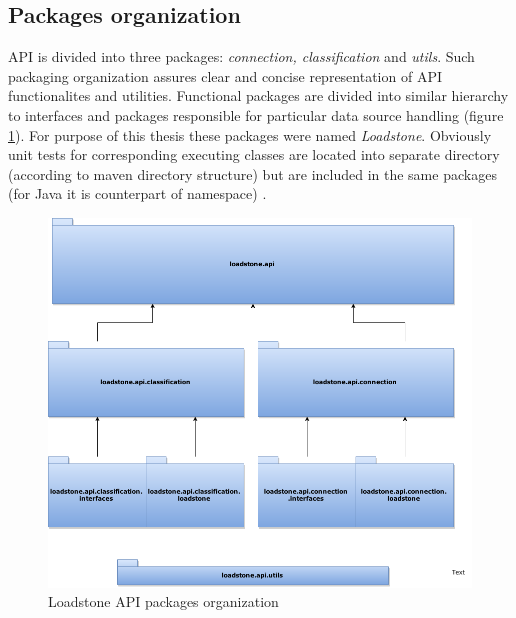 \subsection{Packages organization}
API is divided into three packages: \textit{connection, classification} and \textit{utils}. Such packaging organization assures clear and concise representation of API functionalites and utilities. Functional packages are divided into similar hierarchy to interfaces and packages responsible for particular data source handling (figure \ref{fig:@=packages_oragnization}). For purpose of this thesis these packages were named \textit{Loadstone}. Obviously unit tests for corresponding executing classes are located into separate directory (according to maven directory structure) but are included in the same packages (for Java it is counterpart of namespace) \cite{20}.
\begin{figure}[h]
	\centering
	\includegraphics[scale=0.5]{loadstone_api_packages.png}
	\caption{Loadstone API packages organization}
	\label{fig:@=packages_oragnization}
\end{figure}
